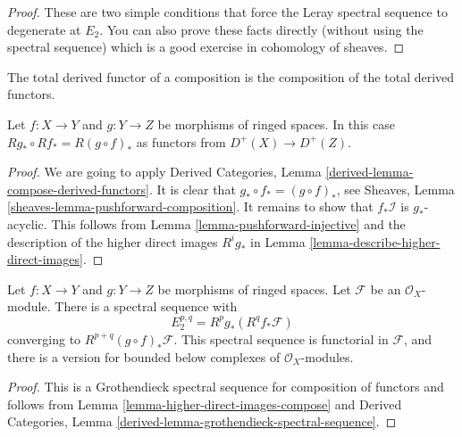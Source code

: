 \begin{proof}
These are two simple conditions that force the Leray spectral sequence to
degenerate at $E_2$. You can also prove these facts directly (without using
the spectral sequence) which is a good exercise in cohomology of sheaves.
\end{proof}

\begin{lemma}
\label{lemma-higher-direct-images-compose}
\begin{slogan}
The total derived functor of a composition is the
composition of the total derived functors.
\end{slogan}
Let $f : X \to Y$ and $g : Y \to Z$ be morphisms of ringed spaces.
In this case $Rg_* \circ Rf_* = R(g \circ f)_*$ as functors
from $D^{+}(X) \to D^{+}(Z)$.
\end{lemma}

\begin{proof}
We are going to apply
Derived Categories, Lemma \ref{derived-lemma-compose-derived-functors}.
It is clear that $g_* \circ f_* = (g \circ f)_*$, see
Sheaves, Lemma \ref{sheaves-lemma-pushforward-composition}.
It remains to show that $f_*\mathcal{I}$ is $g_*$-acyclic.
This follows from Lemma \ref{lemma-pushforward-injective}
and the description of the
higher direct images $R^ig_*$ in
Lemma \ref{lemma-describe-higher-direct-images}.
\end{proof}

\begin{lemma}
\label{lemma-relative-Leray}
Let $f : X \to Y$ and $g : Y \to Z$ be morphisms of ringed spaces.
Let $\mathcal{F}$ be an $\mathcal{O}_X$-module.
There is a spectral sequence with
$$
E_2^{p, q} = R^pg_*(R^qf_*\mathcal{F})
$$
converging to $R^{p + q}(g \circ f)_*\mathcal{F}$.
This spectral sequence is functorial in $\mathcal{F}$, and there
is a version for bounded below complexes of $\mathcal{O}_X$-modules.
\end{lemma}

\begin{proof}
This is a Grothendieck spectral sequence for composition of functors
and follows from Lemma \ref{lemma-higher-direct-images-compose} and
Derived Categories, Lemma \ref{derived-lemma-grothendieck-spectral-sequence}.
\end{proof}














